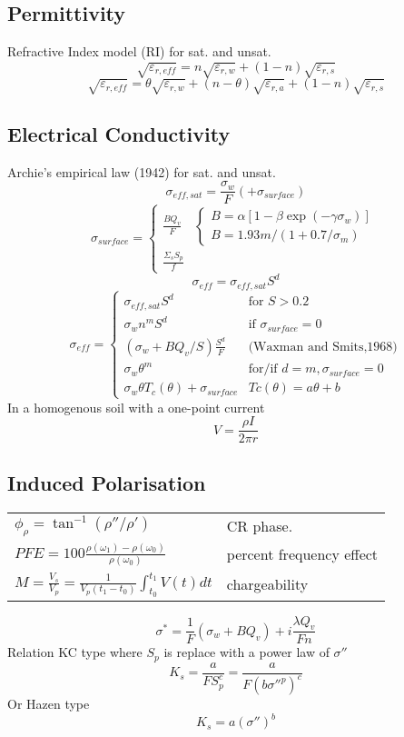 \documentclass[twocolumn]{article}
\begin{document}
\subsection{Permittivity}
Refractive Index model (RI) for sat. and unsat.
\[ \sqrt{\varepsilon_{r,eff}} =n\sqrt{\varepsilon_{r,w}} +(1-n)\sqrt{\varepsilon_{r,s}}\] 
\[ \sqrt{\varepsilon_{r,eff}} =\theta\sqrt{\varepsilon_{r,w}} +(n-\theta)\sqrt{\varepsilon_{r,a}}+(1-n)\sqrt{\varepsilon_{r,s}}\]
 
\subsection{Electrical Conductivity}
Archie's empirical law (1942) for sat. and unsat.
\[ \sigma_{eff,sat} = \frac{\sigma_w}{F} (+\sigma_{surface})\]
\[\sigma_{surface}= \left\{
  \begin{array}{lr}
    \frac{BQ_v}{F} & \left\{
    				\begin{array}{l}
    					B=\alpha[1-\beta \exp(-\gamma\sigma_w)]\\
    					B=1.93m/(1+0.7/\sigma_m)
    				\end{array} \right. \\ 
    \frac{\Sigma_s S_p}{f} &
  \end{array}
\right.\]
\[ \sigma_{eff}=\sigma_{eff,sat}S^d\]
\[\sigma_{eff}= \left\{
  \begin{array}{lr}
    \sigma_{eff,sat}S^d &  \text{for } S>0.2\\ 
    \sigma_{w}n^mS^d & \text{if } \sigma_{surface}=0\\
    (\sigma_{w}+BQ_v/S)\frac{S^d}{F} & \text{(Waxman and Smits,1968)}\\
    \sigma_w \theta^m & \text{for/if } d=m,\sigma_{surface}=0\\
    \sigma_w \theta T_c(\theta)+\sigma_{surface} & Tc(\theta)=a\theta+b
  \end{array}
\right.\]
In a homogenous soil with a one-point current
\[V=\frac{\rho I}{2\pi r}\]
\subsection{Induced Polarisation}
\begin{tabular}{@{}ll@{}}
$\phi_\rho=\tan^{-1}\left(\rho''/\rho'\right)$  & CR phase. \\
$PFE=100\frac{\rho\left(\omega_1\right)-\rho\left(\omega_0\right)}{\rho\left(\omega_0\right)}$  & percent frequency effect \\
$M=\frac{V_s}{V_{p}}=\frac{1}{V_{p}\left(t_1-t_0\right)}\int_{t_0}^{t_1}V(t)dt$  & chargeability \\
\end{tabular}
\[\sigma^*=\frac{1}{F}\left(\sigma_w+BQ_v\right)+i\frac{\lambda Q_v}{Fn}\]
Relation KC type where $S_p$ is replace with a power law of $\sigma''$
\[ K_s=\frac{a}{FS_p^c}=\frac{a}{F(b\sigma''^p)^c}\]
Or Hazen type
\[ K_s=a(\sigma'')^b\]
\end{document}
